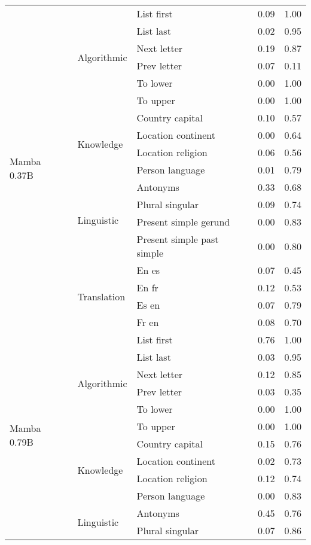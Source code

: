 \begin{center}
\begin{longtable}{lllrr}
\cline{1-5} \cline{2-5}
\multirow[t]{18}{*}{Mamba 0.37B} & \multirow[t]{6}{*}{Algorithmic} & List first & 0.09 & 1.00 \\
 &  & List last & 0.02 & 0.95 \\
 &  & Next letter & 0.19 & 0.87 \\
 &  & Prev letter & 0.07 & 0.11 \\
 &  & To lower & 0.00 & 1.00 \\
 &  & To upper & 0.00 & 1.00 \\
\cline{2-5}
 & \multirow[t]{4}{*}{Knowledge} & Country capital & 0.10 & 0.57 \\
 &  & Location continent & 0.00 & 0.64 \\
 &  & Location religion & 0.06 & 0.56 \\
 &  & Person language & 0.01 & 0.79 \\
\cline{2-5}
 & \multirow[t]{4}{*}{Linguistic} & Antonyms & 0.33 & 0.68 \\
 &  & Plural singular & 0.09 & 0.74 \\
 &  & Present simple gerund & 0.00 & 0.83 \\
 &  & Present simple past simple & 0.00 & 0.80 \\
\cline{2-5}
 & \multirow[t]{4}{*}{Translation} & En es & 0.07 & 0.45 \\
 &  & En fr & 0.12 & 0.53 \\
 &  & Es en & 0.07 & 0.79 \\
 &  & Fr en & 0.08 & 0.70 \\
\cline{1-5} \cline{2-5}
\multirow[t]{18}{*}{Mamba 0.79B} & \multirow[t]{6}{*}{Algorithmic} & List first & 0.76 & 1.00 \\
 &  & List last & 0.03 & 0.95 \\
 &  & Next letter & 0.12 & 0.85 \\
 &  & Prev letter & 0.03 & 0.35 \\
 &  & To lower & 0.00 & 1.00 \\
 &  & To upper & 0.00 & 1.00 \\
\cline{2-5}
 & \multirow[t]{4}{*}{Knowledge} & Country capital & 0.15 & 0.76 \\
 &  & Location continent & 0.02 & 0.73 \\
 &  & Location religion & 0.12 & 0.74 \\
 &  & Person language & 0.00 & 0.83 \\
\cline{2-5}
 & \multirow[t]{4}{*}{Linguistic} & Antonyms & 0.45 & 0.76 \\
 &  & Plural singular & 0.07 & 0.86 \\

\end{longtable}
\end{center}
